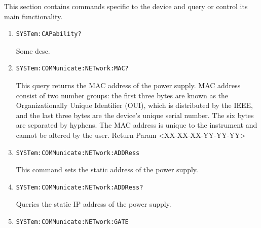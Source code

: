 \documentclass[a4paper,10pt]{article}
\begin{document}
\begin{enumerate}
    \begin{description}
        \item This section contains commands specific to the device and query or control its main functionality.
    \end{description}
    \begin{enumerate}
        \item
            \begin{verbatim}SYSTem:CAPability?\end{verbatim}
            \begin{description}
                Some desc.
            \end{description}
        \item 
            \begin{verbatim}SYSTem:COMMunicate:NETwork:MAC?\end{verbatim}
            \begin{description}
                This query returns the MAC address of the power supply. MAC address consist of two number groups: the first three bytes are known as the Organizationally Unique Identifier (OUI), which is distributed by the IEEE, and the last three bytes are the device’s unique serial number. The six bytes are separated by hyphens. The MAC address is unique to the instrument and cannot be altered by the user.
                \newline
                Return Param <XX-XX-XX-YY-YY-YY>
		    \end{description}
		\item 
		    \begin{verbatim}SYSTem:COMMunicate:NETwork:ADDRess\end{verbatim}
		    \begin{description}
		        This command sets the static address of the power supply.
		    \end{description}
		\item 
		    \begin{verbatim}SYSTem:COMMunicate:NETwork:ADDRess?\end{verbatim}
		    \begin{description}
		        Queries the static IP address of the power supply.
		    \end{description}
		\item 
		    \begin{verbatim}SYSTem:COMMunicate:NETwork:GATE\end{verbatim}
		    \begin{description}

\end{description}
\end{enumerate}
\end{enumerate}
\end{document}

